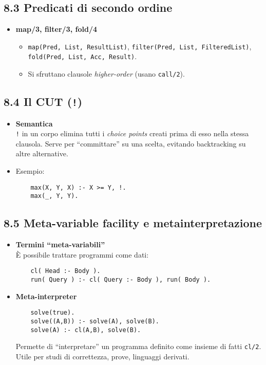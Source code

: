 \documentclass[12pt]{article}
\begin{document}
\subsection*{8.3 Predicati di secondo ordine}

\begin{itemize}
  \item \textbf{map/3, filter/3, fold/4}\\
    \begin{itemize}
      \item \texttt{map(Pred, List, ResultList)}, \texttt{filter(Pred, List, FilteredList)}, \texttt{fold(Pred, List, Acc, Result)}.
      \item Si sfruttano clausole \emph{higher-order} (usano \texttt{call/2}).
    \end{itemize}
\end{itemize}

\subsection*{8.4 Il CUT (\texttt{!})}

\begin{itemize}
  \item \textbf{Semantica}\\
    \texttt{!} in un corpo elimina tutti i \emph{choice points} creati prima di esso nella stessa clausola. Serve per “committare” su una scelta, evitando backtracking su altre alternative.
  \item Esempio:
    \begin{verbatim}
    max(X, Y, X) :- X >= Y, !.
    max(_, Y, Y).
    \end{verbatim}
\end{itemize}

\subsection*{8.5 Meta-variable facility e metainterpretazione}

\begin{itemize}
  \item \textbf{Termini “meta-variabili”}\\
    È possibile trattare programmi come dati:
    \begin{verbatim}
    cl( Head :- Body ).
    run( Query ) :- cl( Query :- Body ), run( Body ).
    \end{verbatim}

  \item \textbf{Meta-interpreter}
    \begin{verbatim}
    solve(true).
    solve((A,B)) :- solve(A), solve(B).
    solve(A) :- cl(A,B), solve(B).
    \end{verbatim}
    Permette di “interpretare” un programma definito come insieme di fatti \texttt{cl/2}. Utile per studi di correttezza, prove, linguaggi derivati.
\end{itemize}
\end{document}
